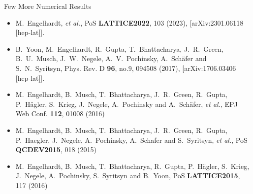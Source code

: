 \documentclass[aspectratio=169, 9pt]{beamer}
\begin{document}
\begin{frame}{Few More Numerical Results}
    \begin{itemize}
        \item M.~Engelhardt, \textit{et al.}, PoS \textbf{LATTICE2022}, 103 (2023), [arXiv:2301.06118 [hep-lat]].
        \item B.~Yoon, M.~Engelhardt, R.~Gupta, T.~Bhattacharya, J.~R.~Green, B.~U.~Musch, J.~W.~Negele, A.~V.~Pochinsky, A.~Sch\"afer and S.~N.~Syritsyn, Phys. Rev. D \textbf{96}, no.9, 094508 (2017), [arXiv:1706.03406 [hep-lat]].
        \item M.~Engelhardt, B.~Musch, T.~Bhattacharya, J.~R.~Green, R.~Gupta, P.~H\"agler, S.~Krieg, J.~Negele, A.~Pochinsky and A.~Sch\"afer, \textit{et al.}, EPJ Web Conf. \textbf{112}, 01008 (2016)
        \item M.~Engelhardt, B.~Musch, T.~Bhattacharya, J.~R.~Green, R.~Gupta, P.~Haegler, J.~Negele, A.~Pochinsky, A.~Schafer and S.~Syritsyn, \textit{et al.}, PoS \textbf{QCDEV2015}, 018 (2015)
        \item M.~Engelhardt, B.~Musch, T.~Bhattacharya, R.~Gupta, P.~H\"agler, S.~Krieg, J.~Negele, A.~Pochinsky, S.~Syritsyn and B.~Yoon, PoS \textbf{LATTICE2015}, 117 (2016)
    \end{itemize}
\end{frame}
\end{document}
